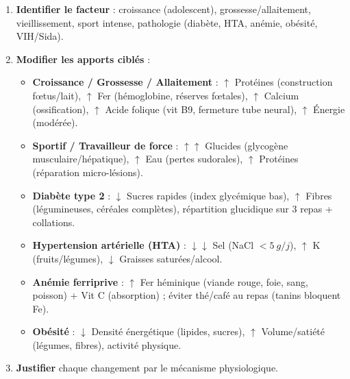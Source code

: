 \documentclass[11pt]{article}
\begin{document}
\begin{methode}
\begin{enumerate}
\item \textbf{Identifier le facteur} : croissance (adolescent), grossesse/allaitement, vieillissement, sport intense, pathologie (diabète, HTA, anémie, obésité, VIH/Sida).
\item \textbf{Modifier les apports ciblés} :
\begin{itemize}
\item \textbf{Croissance / Grossesse / Allaitement} : $\uparrow$ Protéines (construction fœtus/lait), $\uparrow$ Fer (hémoglobine, réserves fœtales), $\uparrow$ Calcium (ossification), $\uparrow$ Acide folique (vit B9, fermeture tube neural), $\uparrow$ Énergie (modérée).
\item \textbf{Sportif / Travailleur de force} : $\uparrow\uparrow$ Glucides (glycogène musculaire/hépatique), $\uparrow$ Eau (pertes sudorales), $\uparrow$ Protéines (réparation micro-lésions).
\item \textbf{Diabète type 2} : $\downarrow$ Sucres rapides (index glycémique bas), $\uparrow$ Fibres (légumineuses, céréales complètes), répartition glucidique sur 3 repas + collations.
\item \textbf{Hypertension artérielle (HTA)} : $\downarrow\downarrow$ Sel (NaCl $< \SI{5}{g/j}$), $\uparrow$ K (fruits/légumes), $\downarrow$ Graisses saturées/alcool.
\item \textbf{Anémie ferriprive} : $\uparrow$ Fer héminique (viande rouge, foie, sang, poisson) + Vit C (absorption) ; éviter thé/café au repas (tanins bloquent Fe).
\item \textbf{Obésité} : $\downarrow$ Densité énergétique (lipides, sucres), $\uparrow$ Volume/satiété (légumes, fibres), activité physique.
\end{itemize}
\item \textbf{Justifier} chaque changement par le mécanisme physiologique.
\end{enumerate}
\end{methode}
\end{document}

